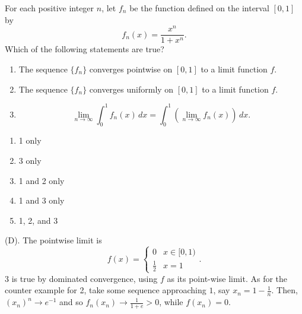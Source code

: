 \begin{exercise}
For each positive integer $n$, let $f_n$ be the function defined on the
interval $[0,1]$ by
\[
f_n(x)=\frac{x^n}{1+x^n}.
\]
Which of the following statements are true?

\begin{enumerate}
    \item The sequence $\{f_n\}$ converges pointwise on $[0,1]$ to a limit
    function $f$.
    
    \item The sequence $\{f_n\}$ converges uniformly on $[0,1]$ to a limit
    function $f$.
    
    \item
    \[
    \lim_{n\to\infty}\int_0^1 f_n(x)\,dx
    =
    \int_0^1\left(\lim_{n\to\infty}f_n(x)\right)\,dx.
    \]
\end{enumerate}

\begin{enumerate}[label=(\Alph*)]
    \item 1 only
    \item 3 only
    \item 1 and 2 only
    \item 1 and 3 only
    \item 1, 2, and 3
\end{enumerate}
\end{exercise}
\begin{solution}
(D). The pointwise limit is 
\[
f(x) = \begin{cases}
0 & x \in [0,1) \\
\frac{1}{2} & x = 1
\end{cases}.
\]
3 is true by dominated convergence, using $f$ as its point-wise limit.
As for the counter example for 2, take some sequence approaching $1$, 
say $x_n = 1 - \frac{1}{n}$. Then, $(x_n)^n \rightarrow e^{-1}$ and so 
$f_n(x_n) \rightarrow \frac{1}{1 + e} > 0$, while $f(x_n)=0$.
\end{solution}


